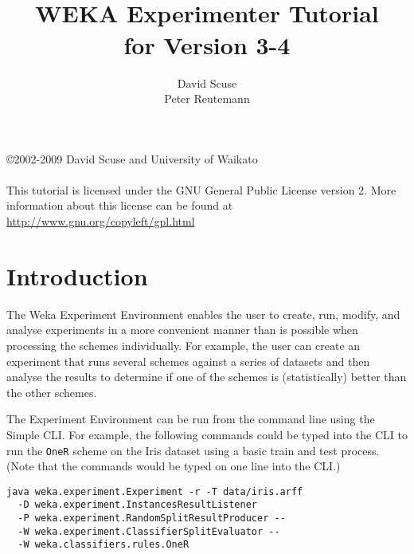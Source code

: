 \documentclass[a4paper]{article}
\title{\epsfig{file=images/coat_of_arms.eps,width=10cm}\vspace{3cm}\\WEKA Experimenter Tutorial\\for Version 3-4}
\author{David Scuse\\Peter Reutemann}
\begin{document}
\begin{titlepage}

\maketitle
\thispagestyle{empty}

\begin{centering}
\begin{table}[b]
\copyright 2002-2009 David Scuse and University of Waikato \\
\\
This tutorial is licensed under the GNU General Public License version 2. More information about this license can be found at \url{http://www.gnu.org/copyleft/gpl.html}
\end{table}
\end{centering}

\end{titlepage}

\tableofcontents


\newpage
\section{Introduction}

The Weka Experiment Environment enables the user to create, run, modify, and analyse experiments in a more convenient manner than is possible when processing the schemes individually. For example, the user can create an experiment that runs several schemes against a series of datasets and then analyse the results to determine if one of the schemes is (statistically) better than the other schemes.

The Experiment Environment can be run from the command line using the Simple CLI. For example, the following commands could be typed into the CLI to run the \texttt{OneR} scheme on the Iris dataset using a basic train and test process. (Note that the commands would be typed on one line into the CLI.)

\begin{verbatim}
java weka.experiment.Experiment -r -T data/iris.arff
  -D weka.experiment.InstancesResultListener
  -P weka.experiment.RandomSplitResultProducer --
  -W weka.experiment.ClassifierSplitEvaluator --
  -W weka.classifiers.rules.OneR
\end{verbatim}
\end{document}
